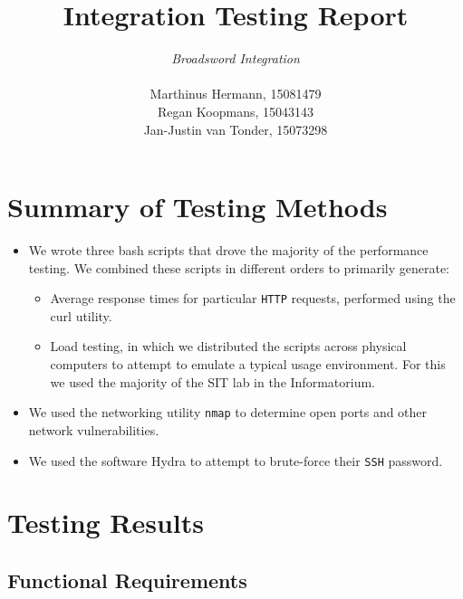 \documentclass[12pt,a4paper,titlepage]{article}
\author{\textit{Broadsword Integration} \\\\
				Marthinus Hermann, 15081479\\
				Regan Koopmans, 15043143 \\
				Jan-Justin van Tonder, 15073298}
\title{\fontsize{40}{40} Integration Testing Report}
\begin{document}
\maketitle

\section{Summary of Testing Methods}

\begin{itemize}
	\item We wrote three bash scripts that drove the majority of the performance testing. We combined these scripts in different orders to primarily generate:
	   \begin{itemize}
			 \item Average response times for particular \texttt{HTTP} requests, performed using the curl utility.
		   \item Load testing, in which we distributed the scripts across physical computers to attempt to emulate a typical usage environment. For this we used the majority of the SIT lab in the Informatorium.
	   \end{itemize}
	\item We used the networking utility \texttt{nmap} to determine open ports and other network vulnerabilities.
	\item We used the software Hydra to attempt to brute-force their \texttt{SSH} password.
\end{itemize}

\section{Testing Results}
\subsection{Functional Requirements}
\end{document}
